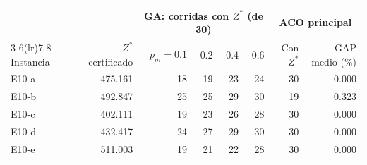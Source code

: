 \begin{tabular}{lrrrrrrr}\toprule
 & & \multicolumn{4}{c}{GA: corridas con $Z^*$ (de 30)} & \multicolumn{2}{c}{ACO principal}\\\cmidrule(lr){3-6}\cmidrule(lr){7-8}
Instancia & $Z^*$ certificado & $p_m=0.1$ & $0.2$ & $0.4$ & $0.6$ & Con $Z^*$ & GAP medio (\%)\\\midrule
E10-a & 475.161 & 18 & 19 & 23 & 24 & 30 & 0.000\\
E10-b & 492.847 & 25 & 25 & 29 & 30 & 19 & 0.323\\
E10-c & 402.111 & 19 & 23 & 26 & 28 & 30 & 0.000\\
E10-d & 432.417 & 24 & 27 & 29 & 30 & 30 & 0.000\\
E10-e & 511.003 & 19 & 21 & 22 & 28 & 30 & 0.000\\
\bottomrule\end{tabular}
